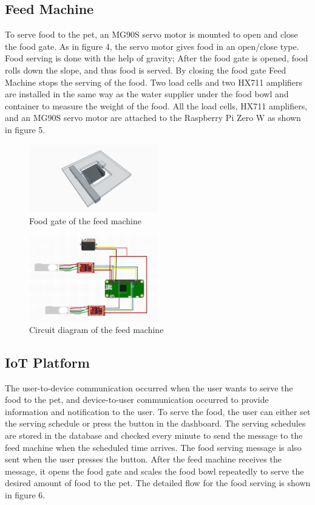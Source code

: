 \documentclass[conference]{IEEEtran}
\begin{document}
\subsection{Feed Machine}
To serve food to the pet, an MG90S servo motor is mounted to open and close the food gate.
As in figure 4, the servo motor gives food in an open/close type.
Food serving is done with the help of gravity; After the food gate is opened, food rolls down the slope, and thus food is served.
By closing the food gate Feed Machine stops the serving of the food.
Two load cells and two HX711 amplifiers are installed in the same way as the water supplier under the food bowl and container to measure the weight of the food.
All the load cells, HX711 amplifiers, and an MG90S servo motor are attached to the Raspberry Pi Zero W as shown in figure 5.

\begin{figure}[htbp]
\centerline{\includegraphics[width=0.5\textwidth]{./images/servo_gate.png}}
\caption{Food gate of the feed machine}
\label{fig}
\end{figure}

\begin{figure}[htbp]
\centerline{\includegraphics[width=0.5\textwidth]{./images/feed machine circuit.jpg}}
\caption{Circuit diagram of the feed machine}
\label{fig}
\end{figure}

\subsection{IoT Platform}
The user-to-device communication occurred when the user wants to serve the food to the pet, and device-to-user communication occurred to provide information and notification to the user.
To serve the food, the user can either set the serving schedule or press the button in the dashboard.
The serving schedules are stored in the database and checked every minute to send the message to the feed machine when the scheduled time arrives.
The food serving message is also sent when the user presses the button.
After the feed machine receives the message, it opens the food gate and scales the food bowl repeatedly to serve the desired amount of food to the pet.
The detailed flow for the food serving is shown in figure 6.
\end{document}
